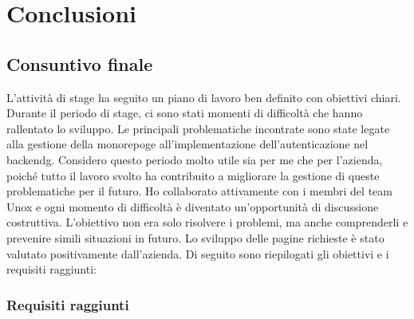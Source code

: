 \chapter{Conclusioni}
\label{chap:conclusioni}
\section{Consuntivo finale}

L'attività di stage ha seguito un piano di lavoro ben definito con obiettivi chiari.
Durante il periodo di stage, ci sono stati momenti di difficoltà che hanno rallentato lo sviluppo.
Le principali problematiche incontrate sono state legate alla gestione della \gls{monorepog}\glox e all'implementazione dell'autenticazione nel \gls{backendg}\glox.
Considero questo periodo molto utile sia per me che per l'azienda, poiché tutto il lavoro svolto ha contribuito a migliorare la gestione di queste problematiche per il futuro.
Ho collaborato attivamente con i membri del team Unox e ogni momento di difficoltà è diventato un'opportunità di discussione costruttiva.
L'obiettivo non era solo risolvere i problemi, ma anche comprenderli e prevenire simili situazioni in futuro.
Lo sviluppo delle pagine richieste è stato valutato positivamente dall'azienda.
Di seguito sono riepilogati gli obiettivi e i requisiti raggiunti:

\subsection{Requisiti raggiunti}


